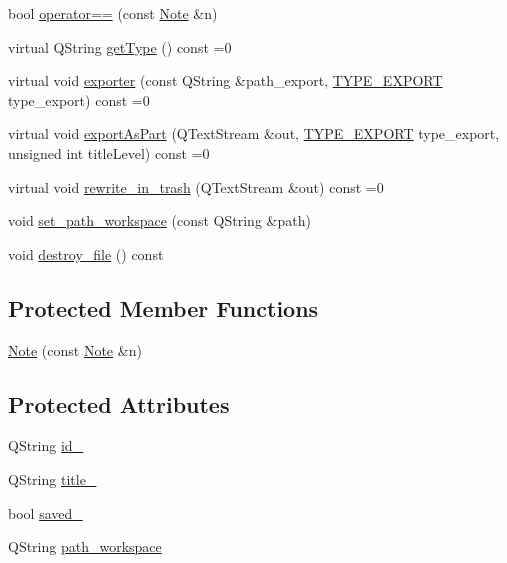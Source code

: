 \begin{DoxyCompactItemize}
\item 
bool \hyperlink{class_notes_module_1_1_note_adb90d548c841fe7f1e3003f87d6b3e4e}{operator==} (const \hyperlink{class_notes_module_1_1_note}{Note} \&n)
\item 
virtual Q\-String \hyperlink{class_notes_module_1_1_note_aabb430fe24e65eda49993d1340583489}{get\-Type} () const =0
\item 
virtual void \hyperlink{class_notes_module_1_1_note_a6b14ab7f7fc1bb12ead4f8c0ba14a1f7}{exporter} (const Q\-String \&path\-\_\-export, \hyperlink{_t_y_p_e_s___e_x_p_o_r_t_8h_a25a17d8584d83ab977791df2476e006c}{T\-Y\-P\-E\-\_\-\-E\-X\-P\-O\-R\-T} type\-\_\-export) const =0
\item 
virtual void \hyperlink{class_notes_module_1_1_note_a71320195744f761430f9efe356c8e55d}{export\-As\-Part} (Q\-Text\-Stream \&out, \hyperlink{_t_y_p_e_s___e_x_p_o_r_t_8h_a25a17d8584d83ab977791df2476e006c}{T\-Y\-P\-E\-\_\-\-E\-X\-P\-O\-R\-T} type\-\_\-export, unsigned int title\-Level) const =0
\item 
virtual void \hyperlink{class_notes_module_1_1_note_a6ec4ccea385dd368fb7c50f52de470d7}{rewrite\-\_\-in\-\_\-trash} (Q\-Text\-Stream \&out) const =0
\item 
void \hyperlink{class_notes_module_1_1_note_a226a634461f3e8af19a3bdcc0f51b2db}{set\-\_\-path\-\_\-workspace} (const Q\-String \&path)
\item 
void \hyperlink{class_notes_module_1_1_note_a35da05dfa309fa6a4f0b1107e2cb114f}{destroy\-\_\-file} () const 
\end{DoxyCompactItemize}
\subsection*{Protected Member Functions}
\begin{DoxyCompactItemize}
\item 
\hyperlink{class_notes_module_1_1_note_adc28c47264120041708da8ab9787ae87}{Note} (const \hyperlink{class_notes_module_1_1_note}{Note} \&n)
\end{DoxyCompactItemize}
\subsection*{Protected Attributes}
\begin{DoxyCompactItemize}
\item 
Q\-String \hyperlink{class_notes_module_1_1_note_aba42f4f45b094e089c594c5e7b902820}{id\-\_\-}
\item 
Q\-String \hyperlink{class_notes_module_1_1_note_a1fbc6b72592111121646e63e545c6539}{title\-\_\-}
\item 
bool \hyperlink{class_notes_module_1_1_note_af36a9fdf26266d2b07ec3d31556f3f68}{saved\-\_\-}
\item 
Q\-String \hyperlink{class_notes_module_1_1_note_acc82121a6739b5e02f5e61d5ef141504}{path\-\_\-workspace}
\end{DoxyCompactItemize}


